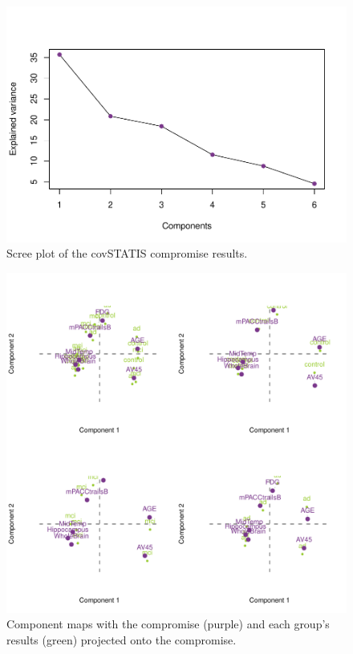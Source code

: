 \documentclass[man,floatsintext]{apa6}
\theoremstyle{definition}
\theoremstyle{definition}
\theoremstyle{definition}
\theoremstyle{remark}
\begin{document}
\begin{figure}[H]

{\centering \includegraphics{3_RMarkdown_APA_Manuscript_files/figure-latex/scree-1} 

}

\caption{Scree plot of the covSTATIS compromise results.}\label{fig:scree}
\end{figure}

\begin{figure}[H]

{\centering \includegraphics{3_RMarkdown_APA_Manuscript_files/figure-latex/unnamed-chunk-1-1} 

}

\caption{Component maps with the compromise (purple) and each group's results (green) projected onto the compromise.}\label{fig:unnamed-chunk-1}
\end{figure}
\end{document}
